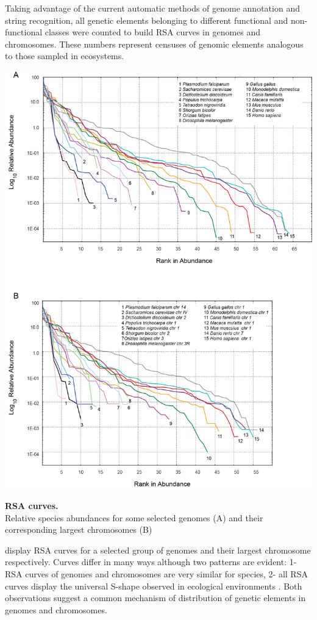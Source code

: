 Taking advantage of the current automatic methods of genome annotation and string recognition, all genetic elements belonging to different functional and non-functional classes were counted to build RSA curves in genomes and chromosomes. These numbers represent censuses of genomic elements analogous to those sampled in ecosystems.

\begin{FPfigure}
\centering 
\includegraphics[width=\textwidth]{tex_source/figures/untb_genomes/SAD_genomes.png}
\caption[RSA curves.]{{\bf RSA curves.} \\ Relative species abundances for some selected genomes (A) and their corresponding largest chromosomes (B)} 
\label{fig:rsa_genomes}
\end{FPfigure}

 display RSA curves for a selected group of genomes and their largest chromosome respectively. Curves differ in many ways although two patterns are evident: 1- RSA curves of genomes and chromosomes are very similar for species, 2- all RSA curves display the universal S-shape observed in ecological environments \cite{McGill2007,Hubbell2001}. Both observations suggest a common mechanism of distribution of genetic elements in genomes and chromosomes.


